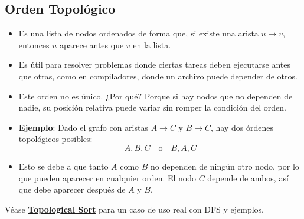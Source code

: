 \documentclass[10pt,a4paper]{article}
\begin{document}
\subsection*{Orden Topológico}
\begin{itemize}
    \item Es una lista de nodos ordenados de forma que, si existe una arista $u \rightarrow v$, entonces $u$ aparece antes que $v$ en la lista.
    \item Es útil para resolver problemas donde ciertas tareas deben ejecutarse antes que otras, como en compiladores, donde un archivo puede depender de otros.
    \item Este orden no es único. ¿Por qué? Porque si hay nodos que no dependen de nadie, su posición relativa puede variar sin romper la condición del orden.
    \item \textbf{Ejemplo}: Dado el grafo con aristas $A \rightarrow C$ y $B \rightarrow C$, hay dos órdenes topológicos posibles: 
    \[
    A, B, C \quad \text{o} \quad B, A, C
    \]
    \item Esto se debe a que tanto $A$ como $B$ no dependen de ningún otro nodo, por lo que pueden aparecer en cualquier orden. El nodo $C$ depende de ambos, así que debe aparecer después de $A$ y $B$.
\end{itemize}
Véase \hyperref[subsubsec:topological_sort]{\textbf{Topological Sort}} para un caso de uso real con DFS y ejemplos. 
\end{document}
